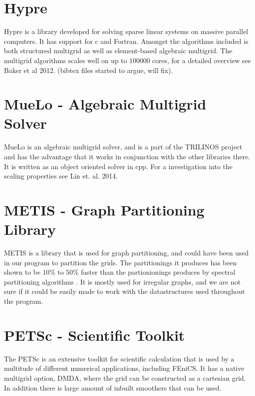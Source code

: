 \section{Hypre}
Hypre is a library developed for solving sparse linear systems on massive parallel computers. It has support for c and Fortran. Amongst the algorithms included is both structured multigrid as well as element-based algebraic multigrid. The multigrid algorithms scales well on up to \(100 000\) cores, for a detailed overview see Baker et al 2012. (bibtex files started to argue, will fix).

\section{MueLo - Algebraic Multigrid Solver} 
MueLo is an algebraic multigrid solver, and is a part of the TRILINOS project and has the advantage that it works in conjunction with the other libraries there. It is written as an object oriented solver in cpp. For a investigation into the scaling properties see Lin et. al. 2014.


\section{METIS - Graph Partitioning Library}
METIS is a library that is used for graph partitioning, and could have been used in our program to partition the grids. The partitionings it produces has been shown to be \(10\%\) to \(50\%\) faster than the partionionings produces by spectral partitioning algorithms \citep{Karypis}. It is mostly used for irregular graphs, and we are not sure if it could be easily made to work with the datastructures used throughout the program.


\section{PETSc - Scientific Toolkit}
The PETSc is an extensive toolkit for scientific calculation that is used by a multitude of different numerical applications, including FEniCS. It has a native multigrid option, DMDA, where the grid can be constructed as a cartesian grid. In addition there is large amount of inbuilt smoothers that can be used.
